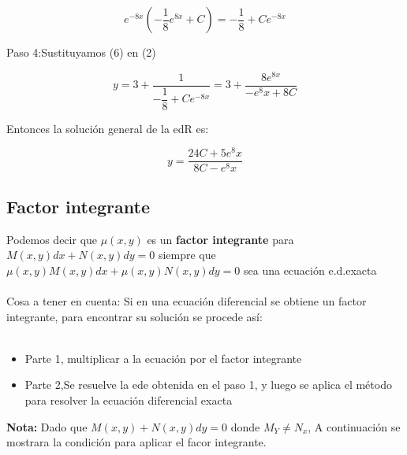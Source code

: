 \documentclass[10pt,a4paper]{article}
\begin{document}
{{{{{{{{{ {\begin{equation} \tag{6} 
    e^{-8x}(-\dfrac{1}{8}e^{8x}+C)=-\dfrac{1}{8}+Ce^{-8x}
 \end{equation}
 
Paso 4:Sustituyamos (6) en (2) 
  {\begin{equation*}
    y=3+\dfrac{1}{-\dfrac{1}{8}+Ce^{-8x}}=3+\dfrac{8e^{8x}}{-e^8x+8C}
\end{equation*}

Entonces la solución general de la edR es:
 {\begin{equation*}
    y=\dfrac{24C+5e^8x}{8C-e^8x}
\end{equation*}
  
  \subsection{Factor integrante}
  
Podemos decir que $\mu(x,y)$  es un \textbf{factor integrante} para $M(x,y)dx+N(x,y)dy=0$ siempre que $\mu(x,y)M(x,y)dx+\mu(x,y)N(x,y)dy=0$ sea una ecuación e.d.exacta\\
\,\\
Cosa a tener en cuenta:
Si en una ecuación diferencial se obtiene un factor integrante, para encontrar su solución se procede así:\\
\,\\
\begin{itemize}

\item Parte 1, multiplicar a la ecuación por el factor integrante\\
\item Parte 2,Se resuelve la ede obtenida en el paso 1, y luego se aplica el método para resolver la ecuación diferencial exacta\\
\end{itemize}
\textbf{Nota:} Dado que $M(x,y)+N(x,y)dy=0$ donde $M_Y\neq N_x$, A continuación se mostrara la condición para aplicar el facor integrante.

}}}}}}}}}}}}
\end{document}
